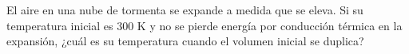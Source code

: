\item El aire en una nube de tormenta se expande a medida que se eleva. Si su temperatura inicial es 300 K y no se pierde energía por conducción térmica en la expansión, ¿cuál es su temperatura cuando el volumen inicial se duplica?
